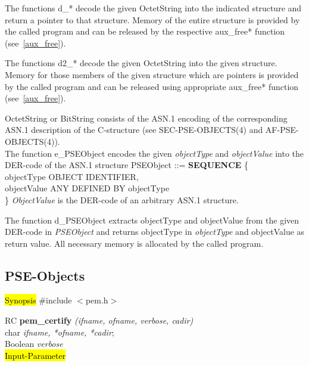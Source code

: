 The functions d\_* decode the given OctetString into the indicated structure and return
a pointer to that structure. Memory of the entire structure is provided 
by the called program and can be released by the respective aux\_free* function (see~\ref{aux_free}).

The functions d2\_* decode the given OctetString into the given structure.
Memory for those members of the given structure which are pointers is provided 
by the called program and can be released using appropriate aux\_free* function (see~\ref{aux_free}).

OctetString or BitString consists of the ASN.1 encoding of the corresponding ASN.1 description of the C-structure (see SEC-PSE-OBJECTS(4) and AF-PSE-OBJECTS(4)). 
\\ [1em]
The function e\_PSEObject encodes the given {\em objectType} and {\em objectValue} into the
DER-code of the ASN.1 structure
\bc
{\small
\bvtab
PSEObject ::= \3 {\bf SEQUENCE} \{ \\
\5 objectType \3 OBJECT IDENTIFIER, \\
\5 objectValue \3 ANY DEFINED BY objectType \\
\3 \}
\evtab
}
\ec
{\em ObjectValue} is the DER-code of an arbitrary ASN.1 structure. 

The function d\_PSEObject extracts objectType and objectValue from the given
DER-code in {\em PSEObject} and returns objectType in {\em objectType} and
objectValue as return value. All necessary memory is allocated by the 
called program.

\subsection{PSE-Objects}
\label{pem_certify}
\hl{Synopsis}
\#include $<$pem.h$>$ 

RC {\bf pem\_certify} {\em (ifname, ofname, verbose, cadir)} \\
char {\em *ifname, *ofname, *cadir}; \\
Boolean {\em verbose} \\
\hl{Input-Parameter}


